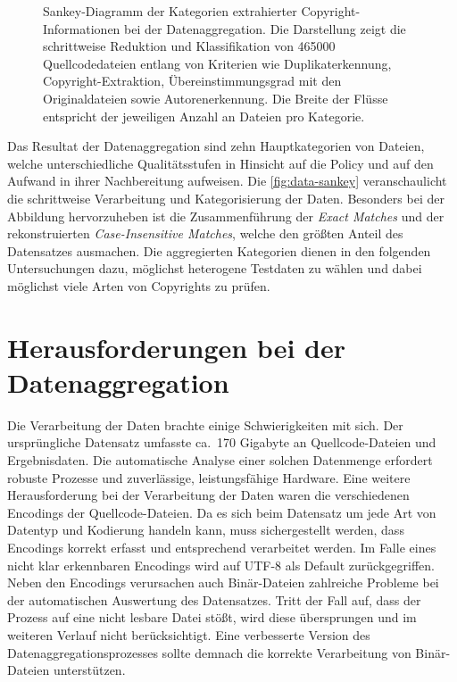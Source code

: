 \begin{figure}[ht]
    \centering
    \caption{
Sankey-Diagramm der Kategorien extrahierter Copyright-Informationen bei der Datenaggregation. Die Darstellung zeigt die schrittweise Reduktion und Klassifikation von \num{465000} Quellcodedateien entlang von Kriterien wie Duplikaterkennung, Copyright-Extraktion, Übereinstimmungsgrad mit den Originaldateien sowie Autorenerkennung. Die Breite der Flüsse entspricht der jeweiligen Anzahl an Dateien pro Kategorie.}
    \label{fig:data-sankey}
\end{figure}
Das Resultat der Datenaggregation sind zehn Hauptkategorien von Dateien, welche unterschiedliche Qualitätsstufen in Hinsicht auf die Policy und auf den Aufwand in ihrer Nachbereitung aufweisen.
Die \autoref{fig:data-sankey} veranschaulicht die schrittweise Verarbeitung und Kategorisierung der Daten.
Besonders bei der Abbildung hervorzuheben ist die Zusammenführung der \textit{Exact Matches} und der rekonstruierten \textit{Case-Insensitive Matches}, welche den größten Anteil des Datensatzes ausmachen.
Die aggregierten Kategorien dienen in den folgenden Untersuchungen dazu, möglichst heterogene Testdaten zu wählen und dabei möglichst viele Arten von Copyrights zu prüfen.


\section{Herausforderungen bei der Datenaggregation}\label{sec:herausforderungen-datenaggregation}

Die Verarbeitung der Daten brachte einige Schwierigkeiten mit sich.
Der ursprüngliche Datensatz umfasste ca.\ 170 Gigabyte an Quellcode-Dateien und Ergebnisdaten.
Die automatische Analyse einer solchen Datenmenge erfordert robuste Prozesse und zuverlässige, leistungsfähige Hardware.
Eine weitere Herausforderung bei der Verarbeitung der Daten waren die verschiedenen Encodings der Quellcode-Dateien.
Da es sich beim Datensatz um jede Art von Datentyp und Kodierung handeln kann, muss sichergestellt werden, dass Encodings korrekt erfasst und entsprechend verarbeitet werden.
Im Falle eines nicht klar erkennbaren Encodings wird auf UTF-8 als Default zurückgegriffen.
Neben den Encodings verursachen auch Binär-Dateien zahlreiche Probleme bei der automatischen Auswertung des Datensatzes.
Tritt der Fall auf, dass der Prozess auf eine nicht lesbare Datei stößt, wird diese übersprungen und im weiteren Verlauf nicht berücksichtigt.
Eine verbesserte Version des Datenaggregationsprozesses sollte demnach die korrekte Verarbeitung von Binär-Dateien unterstützen.

